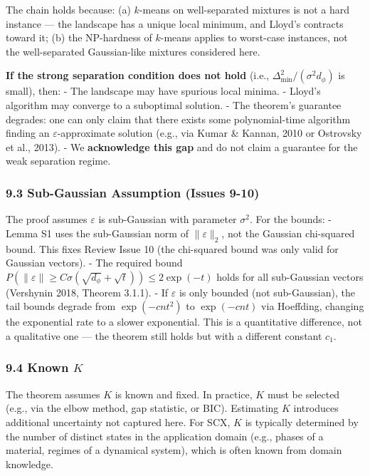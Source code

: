 \documentclass[
  12pt,
]{article}
\begin{document}
The chain holds because: (a) \(k\)-means on well-separated mixtures is
not a hard instance --- the landscape has a unique local minimum, and
Lloyd's contracts toward it; (b) the NP-hardness of \(k\)-means applies
to worst-case instances, not the well-separated Gaussian-like mixtures
considered here.

\textbf{If the strong separation condition does not hold} (i.e.,
\(\Delta_{\min}^2 / (\sigma^2 d_\phi)\) is small), then: - The landscape
may have spurious local minima. - Lloyd's algorithm may converge to a
suboptimal solution. - The theorem's guarantee degrades: one can only
claim that there exists some polynomial-time algorithm finding an
\(\varepsilon\)-approximate solution (e.g., via Kumar \& Kannan, 2010 or
Ostrovsky et al., 2013). - We \textbf{acknowledge this gap} and do not
claim a guarantee for the weak separation regime.

\subsubsection{9.3 Sub-Gaussian Assumption (Issues
9-10)}\label{sub-gaussian-assumption-issues-9-10}

The proof assumes \(\varepsilon\) is sub-Gaussian with parameter
\(\sigma^2\). For the bounds: - Lemma S1 uses the sub-Gaussian norm of
\(\|\varepsilon\|_2\), not the Gaussian chi-squared bound. This fixes
Review Issue 10 (the chi-squared bound was only valid for Gaussian
vectors). - The required bound
\(P(\|\varepsilon\| \geq C\sigma(\sqrt{d_\phi} + \sqrt{t})) \leq 2\exp(-t)\)
holds for all sub-Gaussian vectors (Vershynin 2018, Theorem 3.1.1). - If
\(\varepsilon\) is only bounded (not sub-Gaussian), the tail bounds
degrade from \(\exp(-c n t^2)\) to \(\exp(-c n t)\) via Hoeffding,
changing the exponential rate to a slower exponential. This is a
quantitative difference, not a qualitative one --- the theorem still
holds but with a different constant \(c_1\).

\subsubsection{\texorpdfstring{9.4 Known
\(K\)}{9.4 Known K}}\label{known-k}

The theorem assumes \(K\) is known and fixed. In practice, \(K\) must be
selected (e.g., via the elbow method, gap statistic, or BIC). Estimating
\(K\) introduces additional uncertainty not captured here. For SCX,
\(K\) is typically determined by the number of distinct states in the
application domain (e.g., phases of a material, regimes of a dynamical
system), which is often known from domain knowledge.
\end{document}
